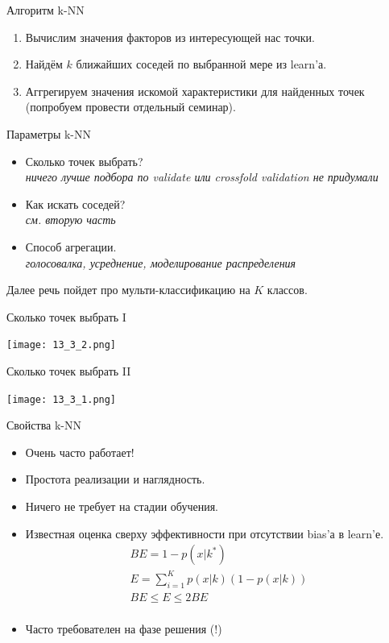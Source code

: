 \documentclass[14pt, fleqn, xcolor={dvipsnames, table}]{beamer}
\begin{document}
\begin{frame}{Алгоритм k-NN}
  \begin{enumerate}
    \item Вычислим значения факторов из интересующей нас точки.
    \item Найдём $k$ ближайших соседей по выбранной мере из learn'а.
    \item Аггрегируем значения искомой характеристики для найденных точек (попробуем провести отдельный семинар).
  \end{enumerate}
\end{frame}

\begin{frame}{Параметры k-NN}
  \begin{itemize}
    \item Сколько точек выбрать? \\
    \emph{ничего лучше подбора по validate или crossfold validation не придумали}
    \item Как искать соседей? \\
    \emph{см. вторую часть}
    \item Способ агрегации. \\
    \emph{голосовалка, усреднение, моделирование распределения}
  \end{itemize}
  Далее речь пойдет про мульти-классификацию на $K$ классов.
\end{frame}

\begin{frame}{Сколько точек выбрать I}
\begin{center}
\texttt{[image: 13\_3\_2.png]}
\end{center}
\end{frame}

\begin{frame}{Сколько точек выбрать II}
\begin{center}
\texttt{[image: 13\_3\_1.png]}
\end{center}
\end{frame}


\begin{frame}{Свойства k-NN}
  \begin{itemize}
    \item Очень часто работает! 
    \item Простота реализации и наглядность.
    \item Ничего не требует на стадии обучения.
    \item Известная оценка сверху эффективности при отсутствии bias'а в learn'е. \\
    $$
      \begin{array}{l}
      BE = 1 - p(x|k^*) \\
      E = \sum_{i=1}^Kp(x|k)(1-p(x|k)) \\
      BE \le E \le 2BE \\
      \end{array}
    $$
    \item Часто требователен на фазе решения (!)
  \end{itemize}
\end{frame}
\end{document}
